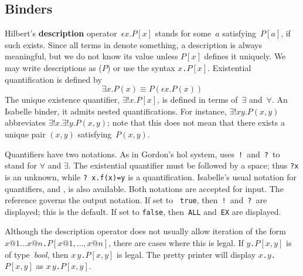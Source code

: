 \subsection{Binders}
Hilbert's {\bf description} operator~$\epsilon x.P[x]$ stands for some~$a$
satisfying~$P[a]$, if such exists.  Since all terms in {\HOL} denote
something, a description is always meaningful, but we do not know its value
unless $P[x]$ defines it uniquely.  We may write descriptions as
($P$) or use the syntax
\hbox{\tt \at $x$.$P[x]$}.  Existential quantification is defined
by
\[ \exists x.P(x) \equiv P(\epsilon x.P(x)) \]
The unique existence quantifier, $\exists!x.P[x]$, is defined in terms
of~$\exists$ and~$\forall$.  An Isabelle binder, it admits nested
quantifications.  For instance, $\exists!x y.P(x,y)$ abbreviates
$\exists!x. \exists!y.P(x,y)$; note that this does not mean that there
exists a unique pair $(x,y)$ satisfying~$P(x,y)$.

Quantifiers have two notations.  As in Gordon's {\sc hol} system, {\HOL}
uses~{\tt!}\ and~{\tt?}\ to stand for $\forall$ and $\exists$.  The
existential quantifier must be followed by a space; thus {\tt?x} is an
unknown, while \verb'? x.f(x)=y' is a quantification.  Isabelle's usual
notation for quantifiers,  and , is also
available.  Both notations are accepted for input.  The {\ML} reference
 governs the output notation.  If set to {\tt
true}, then~{\tt!}\ and~{\tt?}\ are displayed; this is the default.  If set
to {\tt false}, then~{\tt ALL} and~{\tt EX} are displayed.

\begin{warn}
Although the description operator does not usually allow iteration of the
form \hbox{\tt \at $x@1 \dots x@n$.$P[x@1,\dots,x@n]$}, there are cases where
this is legal.  If \hbox{\tt \at $y$.$P[x,y]$} is of type~{\it bool},
then \hbox{\tt \at $x\,y$.$P[x,y]$} is legal.  The pretty printer will
display \hbox{\tt \at $x$.\at $y$.$P[x,y]$} as
\hbox{\tt \at $x\,y$.$P[x,y]$}.
\end{warn}

